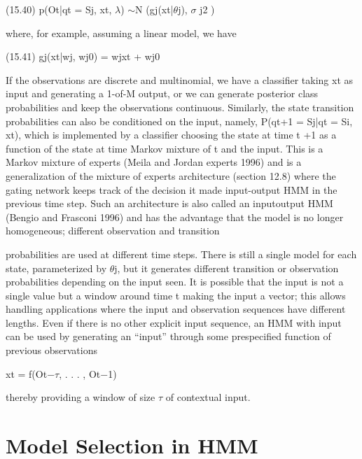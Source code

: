 (15.40) p(Ot|qt = Sj, xt, $\lambda$) $\sim$N (gj(xt|$\theta$j), $\sigma$ j2 )

where, for example, assuming a linear model, we have

(15.41) gj(xt|wj, wj0) = wjxt + wj0

If the observations are discrete and multinomial, we have a classifier taking xt as input and generating a 1-of-M output, or we can generate posterior class probabilities and keep the observations continuous. Similarly, the state transition probabilities can also be conditioned on the input, namely, P(qt+1 = Sj|qt = Si, xt), which is implemented by a classifier choosing the state at time t +1 as a function of the state at time Markov mixture of t and the input. This is a Markov mixture of experts (Meila and Jordan experts 1996) and is a generalization of the mixture of experts architecture (section 12.8) where the gating network keeps track of the decision it made input-output HMM in the previous time step. Such an architecture is also called an inputoutput HMM (Bengio and Frasconi 1996) and has the advantage that the model is no longer homogeneous; different observation and transition

probabilities are used at different time steps. There is still a single model for each state, parameterized by $\theta$j, but it generates different transition or observation probabilities depending on the input seen. It is possible that the input is not a single value but a window around time t making the input a vector; this allows handling applications where the input and observation sequences have different lengths. Even if there is no other explicit input sequence, an HMM with input can be used by generating an “input” through some prespecified function of previous observations

xt = f(Ot$-$$\tau$, . . . , Ot$-$1)

thereby providing a window of size $\tau$ of contextual input.

\section{Model Selection in HMM}


